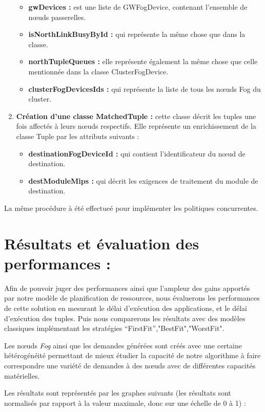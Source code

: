 \begin{enumerate}
\begin{itemize}
     \item \textbf{gwDevices :} est une liste de GWFogDevice, contenant l'ensemble de nœuds passerelles.
     \item \textbf{isNorthLinkBusyById :} qui représente la même chose que dans la classe.
     \item \textbf{northTupleQueues :} elle représente également la même chose que celle mentionnée dans la classe ClusterFogDevice.
     \item \textbf{clusterFogDevicesIds :} qui représente la liste de tous les nœuds Fog du cluster.
     \end{itemize}
     \item \textbf{Création d'une classe MatchedTuple :} cette classe décrit les tuples une fois affectés à leurs nœuds respectifs. Elle représente un enrichissement de la classe Tuple par les attributs suivants :
     \begin{itemize}
         \item \textbf{destinationFogDeviceId :} qui contient l'identificateur du nœud de destination.
         \item \textbf{destModuleMips :} qui décrit les exigences de traitement du module de destination.
     \end{itemize}
\end{enumerate}
La même procédure à été effectueé pour implémenter les politiques concurrentes.

\section{Résultats et évaluation des performances :}
Afin de pouvoir juger des performances ainsi que l'ampleur des gains apportés par notre modèle de planification de ressources, nous évaluerons les performances de cette solution en mesurant le délai d'exécution des applications, et le délai d'exécution des tuples. Puis nous comparerons les résultats avec des modèles classiques implémentant les stratégies “FirstFit”,"BestFit","WorstFit".\par
Les nœuds \emph{Fog} ainsi que les demandes générées sont créés avec une certaine hétérogénéité permettant de mieux étudier la capacité de notre algorithme à faire correspondre une variété de demandes à des nœuds avec de différentes capacités matérielles.\par
Les résultats sont représentés par les graphes suivants (les résultats sont normalisés par rapport à la valeur maximale, donc sur une échelle de 0 à 1) :

